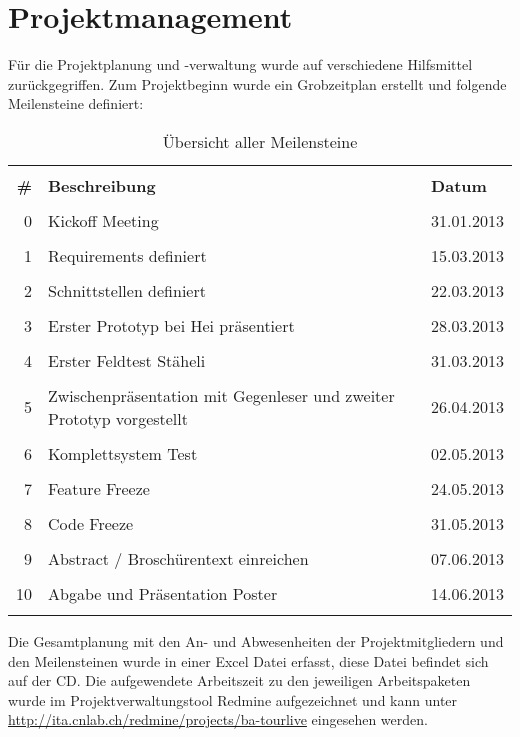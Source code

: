\section{Projektmanagement}
Für die Projektplanung und -verwaltung wurde auf verschiedene Hilfsmittel zurückgegriffen. Zum Projektbeginn wurde ein Grobzeitplan erstellt und folgende Meilensteine definiert:

\begin{longtable}{r|p{7.3cm}|l}
& &  \\ [-1.5ex]
\textbf{\#} & \textbf{Beschreibung} & \textbf{Datum} \\ [1ex] \hline \hline & &  \\ [-1.5ex]
0 & Kickoff Meeting & 31.01.2013 \\ [1ex] \hline & &  \\ [-1.5ex]
1 & Requirements definiert & 15.03.2013 \\ [1ex] \hline & &  \\ [-1.5ex]
2 & Schnittstellen definiert & 22.03.2013 \\ [1ex] \hline & &  \\ [-1.5ex]
3 & Erster Prototyp bei Hei präsentiert & 28.03.2013 \\ [1ex] \hline & &  \\ [-1.5ex]
4 & Erster Feldtest Stäheli & 31.03.2013 \\ [1ex] \hline & &  \\ [-1.5ex]
5 & Zwischenpräsentation mit Gegenleser und zweiter Prototyp vorgestellt & 26.04.2013 \\ [3.5ex] \hline & &  \\ [-1.5ex]
6 & Komplettsystem Test & 02.05.2013 \\ [1ex] \hline & &  \\ [-1.5ex]
7 & Feature Freeze & 24.05.2013 \\ [1ex] \hline & &  \\ [-1.5ex]
8 & Code Freeze & 31.05.2013 \\ [1ex] \hline & &  \\ [-1.5ex]
9 & Abstract / Broschürentext einreichen &  07.06.2013 \\ [1ex] \hline & &  \\ [-1.5ex]
10 & Abgabe und Präsentation Poster & 14.06.2013 \\ [1ex] 
\caption{Übersicht aller Meilensteine}
\end{longtable} 

Die Gesamtplanung mit den An- und Abwesenheiten der Projektmitgliedern und den Meilensteinen wurde in einer Excel Datei erfasst, diese Datei befindet sich auf der CD. Die aufgewendete Arbeitszeit zu den jeweiligen Arbeitspaketen wurde im Projektverwaltungstool Redmine aufgezeichnet und kann unter \url{http://ita.cnlab.ch/redmine/projects/ba-tourlive} eingesehen werden.
\\

